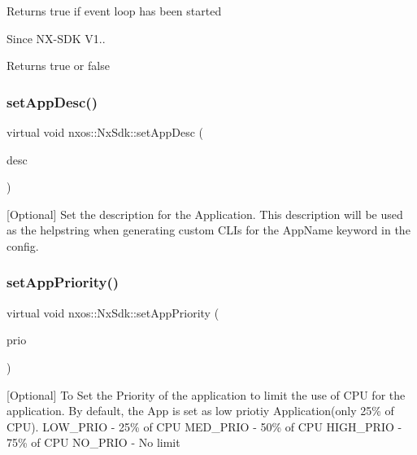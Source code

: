 Returns true if event loop has been started

\begin{DoxySince}{Since}
N\+X-\/\+S\+DK V1..
\end{DoxySince}
\begin{DoxyReturn}{Returns}
true or false 
\end{DoxyReturn}
\mbox{\label{classnxos_1_1_nx_sdk_a2c6007a383114285951b2d2a062dacec}} 
\subsubsection{\texorpdfstring{set\+App\+Desc()}{setAppDesc()}}
{\footnotesize\ttfamily virtual void nxos\+::\+Nx\+Sdk\+::set\+App\+Desc (\begin{DoxyParamCaption}\item[{std\+::string}]{desc }\end{DoxyParamCaption})\hspace{0.3cm}{\ttfamily [pure virtual]}}

\mbox{[}Optional\mbox{]} Set the description for the Application. This description will be used as the helpstring when generating custom C\+L\+Is for the App\+Name keyword in the config. \mbox{\label{classnxos_1_1_nx_sdk_a46d9487216506aa19e5499759f5eaef7}} 
\subsubsection{\texorpdfstring{set\+App\+Priority()}{setAppPriority()}}
{\footnotesize\ttfamily virtual void nxos\+::\+Nx\+Sdk\+::set\+App\+Priority (\begin{DoxyParamCaption}\item[{\mbox{\hyperlink{namespacenxos_af446a76676837368bde9b15343ae21d5}{nxos\+::prio\+\_\+e}}}]{prio }\end{DoxyParamCaption})\hspace{0.3cm}{\ttfamily [pure virtual]}}

\mbox{[}Optional\mbox{]} To Set the Priority of the application to limit the use of C\+PU for the application. By default, the App is set as low priotiy Application(only 25\% of C\+PU). L\+O\+W\+\_\+\+P\+R\+IO -\/ 25\% of C\+PU M\+E\+D\+\_\+\+P\+R\+IO -\/ 50\% of C\+PU H\+I\+G\+H\+\_\+\+P\+R\+IO -\/ 75\% of C\+PU N\+O\+\_\+\+P\+R\+IO -\/ No limit

